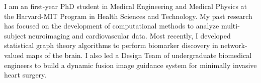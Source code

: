 \documentclass[11pt, letterpaper, sans, citecolor=blue, colorlinks=true, urlcolor=blue]{moderncv}
\begin{document}
\makecvtitle
\vspace*{-1.5\baselineskip}
I am an first-year PhD student in Medical Engineering and Medical Physics at the Harvard-MIT Program in Health Sciences and Technology. My past research has focused on the development of computational methods to analyze multi-subject neuroimaging and cardiovascular data. Most recently, I developed statistical graph theory algorithms to perform biomarker discovery in network-valued maps of the brain.
I also led a Design Team of undergraduate biomedical engineers to build a dynamic fusion image guidance system for minimally invasive heart surgery.


% 




% 

\end{document}
